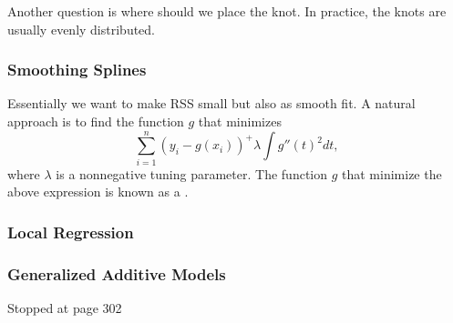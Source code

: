 Another question is where should we place the knot. In practice, the knots are usually evenly distributed.

\subsubsection{Smoothing Splines}
Essentially we want to make RSS small but also as smooth fit. A natural approach is to find the function $g$ that minimizes $$ \sum_{i=1}^{n}(y_i - g(x_i))^ + \lambda \int g''(t)^2 dt,$$ where $\lambda$ is a nonnegative tuning parameter. The function $g$ that minimize the above expression is known as a .

\subsubsection{Local Regression}

\subsubsection{Generalized Additive Models}
Stopped at page 302